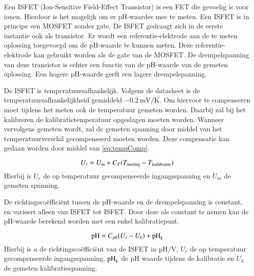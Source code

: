 Een ISFET (Ion-Sensitive Field-Effect Transistor) is een FET die gevoelig is voor ionen. Hierdoor is het mogelijk om er pH-waardes mee te meten\cite{modeling}. Een ISFET is in principe een MOSFET zonder gate. De ISFET gedraagt zich in de eerste instantie ook als transistor. Er wordt een referentie-elektrode aan de te meten oplossing toegevoegd om de pH-waarde te kunnen meten. Deze referentie-elektrode kan gebruikt worden als de gate van de MOSFET\cite{van1987isfet}. De drempelspanning van deze transistor is echter een functie van de pH-waarde van de gemeten oplossing. Een hogere pH-waarde geeft een lagere drempelspanning\cite{isfet}.

De ISFET is temperatuursafhankelijk\cite{isfet}. Volgens de datasheet is de temperatuursafhankelijkheid gemiddeld $\qty{-0.2}{\milli\volt\per\kelvin}$\cite{Microsens-MSFET}. Om hiervoor te compenseren moet tijdens het meten ook de temperatuur gemeten worden. Daarbij zal bij het kalibreren de kalibratietemperatuur opgeslagen moeten worden. Wanneer vervolgens gemeten wordt, zal de gemeten spanning door middel van het temperatuurverschil gecompenseerd moeten worden. Deze compensatie kan gedaan worden door middel van \cref{eq:tempComp}.

\begin{equation}\label{eq:tempComp}
    U_r = U_m + C_T(T_{meting} - T_{kalibratie})
    \tagaddtext{[\si{\volt}]}
\end{equation}
Hierbij is $U_r$ de op temperatuur gecompenseerde ingangsspanning en $U_m$ de gemeten spanning.

De richtingscoëfficiënt tussen de pH-waarde en de drempelspanning is constant, en varieert alleen van ISFET tot ISFET. Door deze als constant te nemen kan de pH-waarde berekend worden met een enkel kalibratiepunt.

\begin{equation}\label{eq:calcPH}
    \ph = C_{ph}(U_r - U_k) + \ph_k
    \tagaddtext{[pH]}
\end{equation}
Hierbij is $a$ de richtingscoëfficiënt van de ISFET in pH/V, $U_r$ de op temperatuur gecompenseerde ingangsspanning, $\mathrm{pH}_k$ de pH waarde tijdens de kalibratie en $U_k$ de gemeten kalibratiespanning.